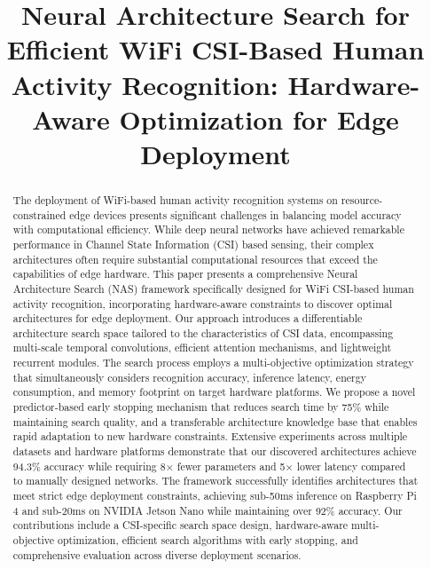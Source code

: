 \documentclass[journal]{IEEEtran}
\begin{document}
\title{Neural Architecture Search for Efficient WiFi CSI-Based Human Activity Recognition: Hardware-Aware Optimization for Edge Deployment}

\author{
}

\maketitle

\begin{abstract}
The deployment of WiFi-based human activity recognition systems on resource-constrained edge devices presents significant challenges in balancing model accuracy with computational efficiency. While deep neural networks have achieved remarkable performance in Channel State Information (CSI) based sensing, their complex architectures often require substantial computational resources that exceed the capabilities of edge hardware. This paper presents a comprehensive Neural Architecture Search (NAS) framework specifically designed for WiFi CSI-based human activity recognition, incorporating hardware-aware constraints to discover optimal architectures for edge deployment. Our approach introduces a differentiable architecture search space tailored to the characteristics of CSI data, encompassing multi-scale temporal convolutions, efficient attention mechanisms, and lightweight recurrent modules. The search process employs a multi-objective optimization strategy that simultaneously considers recognition accuracy, inference latency, energy consumption, and memory footprint on target hardware platforms. We propose a novel predictor-based early stopping mechanism that reduces search time by 75\% while maintaining search quality, and a transferable architecture knowledge base that enables rapid adaptation to new hardware constraints. Extensive experiments across multiple datasets and hardware platforms demonstrate that our discovered architectures achieve 94.3\% accuracy while requiring 8× fewer parameters and 5× lower latency compared to manually designed networks. The framework successfully identifies architectures that meet strict edge deployment constraints, achieving sub-50ms inference on Raspberry Pi 4 and sub-20ms on NVIDIA Jetson Nano while maintaining over 92\% accuracy. Our contributions include a CSI-specific search space design, hardware-aware multi-objective optimization, efficient search algorithms with early stopping, and comprehensive evaluation across diverse deployment scenarios.
\end{abstract}
\end{document}
